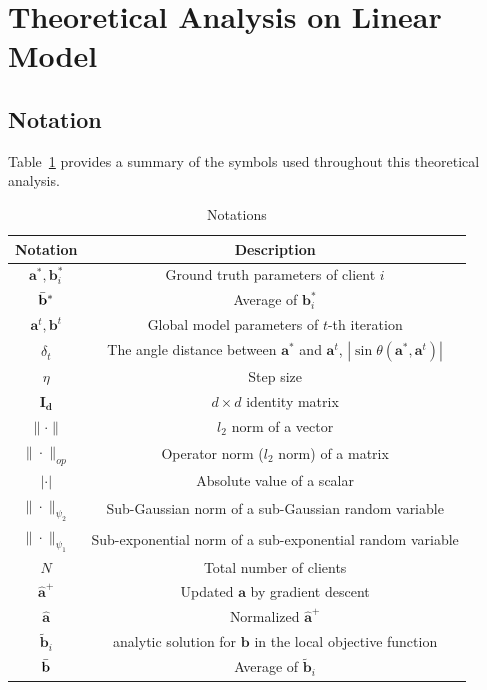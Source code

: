 \documentclass{article}
\theoremstyle{plain}
\theoremstyle{definition}
\theoremstyle{remark}
\begin{document}
\section{Theoretical Analysis on Linear Model} \label{app:theo-linear}
\subsection{Notation}\label{sec:notation}
Table~\ref{tab:notation} provides a summary of the symbols used throughout this theoretical analysis.
\begin{table}[h]
    \centering
    \begin{tabular}{c|c}
    \toprule
        Notation & Description \\
        \midrule
      $\mathbf{a}^*, \mathbf{b}_i^*$   & Ground truth parameters of client $i$\\
       $ \Bar{\mathbf{b}}^*$  & Average of $\mathbf{b}_i^*$\\
       $\mathbf{a}^t, \mathbf{b}^t$  & Global model parameters of $t$-th iteration \\
        $\delta_t$ & The angle distance between $\mathbf{a}^*$ and $\mathbf{a}^t$, $|\sin \theta (\mathbf{a}^*,\mathbf{a}^t)|$\\
        $\eta$  & Step size\\
        $\mathbf{I_d}$ & $d \times d$ identity matrix \\
        $\lVert \cdot\rVert$ & $l_2$ norm of a vector\\
        $\|\cdot\|_{op}$ & Operator norm ($l_2$ norm) of a matrix\\
        $|\cdot|$ & Absolute value of a scalar\\
        $\|\cdot\|_{\psi_2}$ & Sub-Gaussian norm of a sub-Gaussian random variable\\   
        $\|\cdot\|_{\psi_1}$ & Sub-exponential norm of a sub-exponential random variable\\   
        $N $ & Total number of clients \\
        $\hat{\mathbf{a}}^{+}$ & Updated $\mathbf{a}$ by gradient descent\\
        $\hat{\mathbf{a}}$ & Normalized  $\hat{\mathbf{a}}^{+}$\\
        $\tilde{\mathbf{b}}_i $ & analytic solution for $\mathbf{b}$ in the local objective function \\
        $\Bar{\mathbf{b}} $  & Average of $\tilde{\mathbf{b}}_i$\\
        \bottomrule
    \end{tabular}
    \vspace{4pt}
    \caption{Notations}
    \label{tab:notation}
\end{table}
\end{document}
